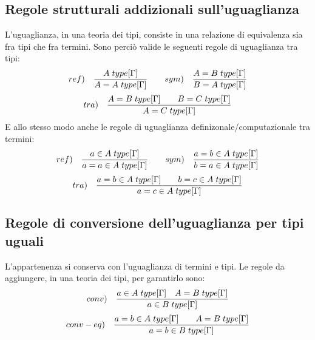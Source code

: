 \documentclass[10pt,a4paper, italian]{book}
\begin{document}
{{\subsection{Regole strutturali addizionali sull'uguaglianza}
\label{subsec:uguaglianza}
L'uguaglianza, in una teoria dei tipi, consiste in una relazione di equivalenza sia fra tipi che fra termini. Sono perci\`o valide le seguenti regole di uguaglianza tra tipi:
\[ ref) \quad \frac{A\hspace{0.1cm}type[\Gamma]}{A=A\hspace{0.1cm}type[\Gamma]} \qquad sym) \quad \frac{A=B\hspace{0.1cm}type[\Gamma]}{B=A\hspace{0.1cm}type[\Gamma]} \]
\[ tra) \quad \frac{A=B\hspace{0.1cm}type[\Gamma] \qquad B=C\hspace{0.1cm}type[\Gamma]}{A=C\hspace{0.1cm}type[\Gamma]} \]
E allo stesso modo anche le regole di uguaglianza definizonale/computazionale tra termini:
\[ ref) \quad \frac{a \in A\hspace{0.1cm}type[\Gamma]}{a=a \in A\hspace{0.1cm}type[\Gamma]} \qquad sym) \quad \frac{a=b\in A \hspace{0.1cm}type[\Gamma]}{b=a \in A\hspace{0.1cm}type[\Gamma]} \]
\[ tra) \quad \frac{a=b \in A\hspace{0.1cm}type[\Gamma] \qquad b=c \in A\hspace{0.1cm}type[\Gamma]}{a=c \in A\hspace{0.1cm}type[\Gamma]} \]
\subsection{Regole di conversione dell'uguaglianza per tipi uguali}
\label{subsec:conversione-uguaglianza}
L'appartenenza si conserva con l'uguaglianza di termini e tipi. Le regole da aggiungere, in una teoria dei tipi, per garantirlo sono:
\[ conv) \quad \frac{a \in A\hspace{0.1cm}type[\Gamma] \quad A=B\hspace{0.1cm}type[\Gamma]}{a \in B\hspace{0.1cm}type[\Gamma]} \]
\[ conv-eq) \quad \frac{a=b \in A\hspace{0.1cm}type[\Gamma] \qquad A=B\hspace{0.1cm}type[\Gamma]}{a=b \in B\hspace{0.1cm}type[\Gamma]} \]
}}
\end{document}
